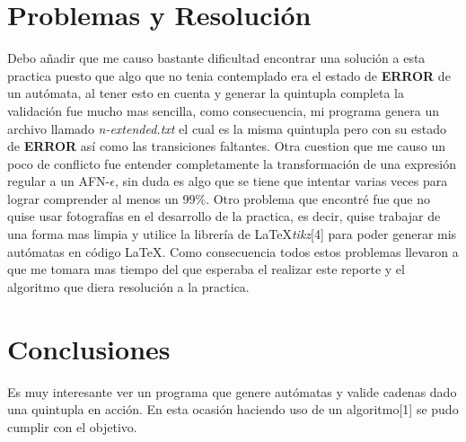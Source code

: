 \section{Problemas y Resolución}

Debo añadir que me causo bastante dificultad encontrar una solución a esta practica puesto que algo que no tenia contemplado era el estado de \textbf{ERROR} de un autómata, al tener esto en cuenta y generar la quintupla completa la validación fue mucho mas sencilla, como consecuencia, mi programa genera un archivo llamado \textit{n-extended.txt} el cual es la misma quintupla pero con su estado de \textbf{ERROR} así como las transiciones faltantes. Otra cuestion que me causo un poco de conflicto fue entender completamente la transformación de una expresión regular a un AFN-$\epsilon$, sin duda es algo que se tiene que intentar varias veces para lograr comprender al menos un 99$\%$. Otro problema que encontré fue que no quise usar fotografías en el desarrollo de la practica, es decir, quise trabajar de una forma mas limpia y utilice la librería de \LaTeX \textit{tikz}[4] para poder generar mis autómatas en código \LaTeX. Como consecuencia todos estos problemas llevaron a que me tomara mas tiempo del que esperaba el realizar este reporte y el algoritmo que diera resolución a la practica.

\section{Conclusiones}

Es muy interesante ver un programa que genere autómatas y valide cadenas dado una quintupla en acción. En esta ocasión haciendo uso de un algoritmo[1] se pudo cumplir con el objetivo.

\pagebreak